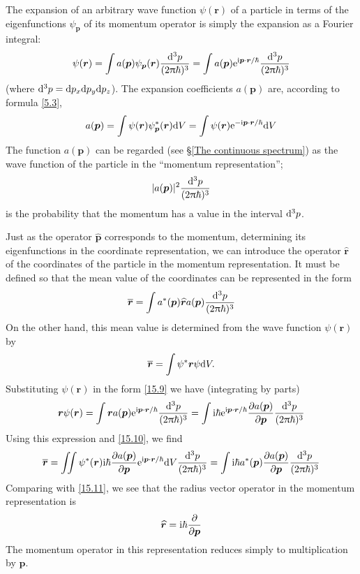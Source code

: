 The expansion of an arbitrary wave function $ \psi(\bm{r}) $ of a particle in terms of the eigenfunctions $ \psi_{\bm{p}} $ of its momentum operator is simply the expansion as a Fourier integral:
\begin{equation}\label{15.9}
\psi(\bm{r})=\int a(\bm{p})\psi_{\bm{p}}(\bm{r})\frac{\mathrm{d}^3p}{(2\uppi\hbar)^3}=\int a(\bm{p})\mathrm{e}^{\mathrm{i} \bm{p}\cdot\bm{r}/\hbar}\frac{\mathrm{d}^3p}{(2\uppi\hbar)^3}
\end{equation}
(where $ \mathrm{d}^3p=\mathrm{d} p_x\mathrm{d} p_y\mathrm{d} p_z $). The expansion coefficients $ a(\bm{p}) $ are, according to formula \eqref{5.3},
\begin{equation}\label{15.10}
a(\bm{p})=\int\psi(\bm{r})\psi_{\bm{p}}^*(\bm{r})\mathrm{d} V=\int\psi(\bm{r})\mathrm{e}^{-\mathrm{i}\bm{p}\cdot\bm{r}/\hbar}\mathrm{d} V
\end{equation}
The function $ a(\bm{p}) $ can be regarded (see \S\ref{The continuous spectrum}) as the wave function of the particle in the “momentum representation”; 
\[ |a (\bm{p})|^2 \frac{\mathrm{d}^3p}{(2\uppi\hbar)^3} \]
is the probability that the momentum has a value in the interval $ \mathrm{d}^3p $.

Just as the operator $ \hat{\bm{p}} $ corresponds to the momentum, determining its eigenfunctions in the coordinate representation, we can introduce the operator $ \hat{\bm{r}} $ of the coordinates of the particle in the momentum representation. It must be defined so that the mean value of the coordinates can be represented in the form
\begin{equation}\label{15.11}
\overline{\bm{r}}=\int a^*(\bm{p})\widehat{\bm{r}}a(\bm{p})\frac{\mathrm{d}^3p}{(2\uppi\hbar)^3}
\end{equation}
On the other hand, this mean value is determined from the wave function $ \psi(\bm{r}) $ by
\[ \overline{\bm{r}}=\int\psi^*\bm{r}\psi\mathrm{d} V. \]
Substituting $ \psi(\bm{r}) $ in the form \eqref{15.9} we have (integrating by parts)
\[ \bm{r}\psi(\bm{r})=\int\bm{r}a(\bm{p})\mathrm{e}^{\mathrm{i}\bm{p}\cdot\bm{r}/\hbar}\frac{\mathrm{d}^3p}{(2\uppi\hbar)^3}=\int\mathrm{i}\hbar\mathrm{e}^{\mathrm{i}\bm{p}\cdot\bm{r}/\hbar}\frac{\partial a(\bm{p})}{\partial \bm{p}}\frac{\mathrm{d}^3 p}{(2\uppi\hbar)^3} \]
Using this expression and \eqref{15.10}, we find
\[ \overline{\bm{r}}=\iint\psi^*(\bm{r})\mathrm{i}\hbar\frac{\partial a(\bm{p})}{\partial \bm{p}}\mathrm{e}^{\mathrm{i}\bm{p}\cdot\bm{r}/\hbar}\mathrm{d} V\frac{\mathrm{d}^3 p}{(2\uppi\hbar)^3}=\int\mathrm{i}\hbar a^*(\bm{p})\frac{\partial a(\bm{p})}{\partial \bm{p}}\frac{\mathrm{d}^3 p}{(2\uppi\hbar)^3} \]
Comparing with \eqref{15.11}, we see that the radius vector operator in the momentum representation is
\begin{equation}\label{15.12}
\widehat{\bm{r}}=\mathrm{i}\hbar\frac{\partial}{\partial \bm{p}}
\end{equation}
The momentum operator in this representation reduces simply to multiplication by $ \bm{p} $.

